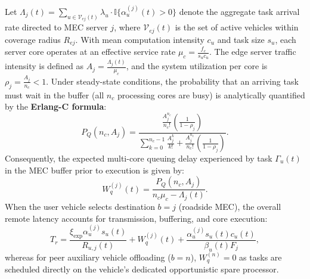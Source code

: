 \documentclass[12pt,a4paper]{article}
\begin{document}
Let $\Lambda_j(t) = \sum_{u \in \mathcal{V}_{ej}(t)} \lambda_u \cdot \mathbb{I}\{\alpha_u^{(j)}(t) > 0\}$ denote the aggregate task arrival rate directed to MEC server $j$, where $\mathcal{V}_{ej}(t)$ is the set of active vehicles within coverage radius $R_{ej}$. With mean computation intensity $c_u$ and task size $s_u$, each server core operates at an effective service rate $\mu_c = \frac{f_c}{s_u c_u}$. The edge server traffic intensity is defined as $A_j = \frac{\Lambda_j(t)}{\mu_c}$, and the system utilization per core is $\rho_j = \frac{A_j}{n_c} < 1$. Under steady-state conditions, the probability that an arriving task must wait in the buffer (all $n_c$ processing cores are busy) is analytically quantified by the \textbf{Erlang-C formula}:
\begin{equation}
P_Q(n_c, A_j) = \frac{\frac{A_j^{n_c}}{n_c!} \left( \frac{1}{1 - \rho_j} \right)}{\sum_{k=0}^{n_c - 1} \frac{A_j^k}{k!} + \frac{A_j^{n_c}}{n_c!} \left( \frac{1}{1 - \rho_j} \right)}.
\label{eq:erlang_c_prob}
\end{equation}
Consequently, the expected multi-core queuing delay experienced by task $\Gamma_u(t)$ in the MEC buffer prior to execution is given by:
\begin{equation}
W_q^{(j)}(t) = \frac{P_Q(n_c, A_j)}{n_c \mu_c - \Lambda_j(t)}.
\label{eq:erlang_c_delay}
\end{equation}
When the user vehicle selects destination $b = j$ (roadside MEC), the overall remote latency accounts for transmission, buffering, and core execution:
\begin{equation}
T_r = \frac{\xi_{\mathrm{exp}} \alpha_u^{(j)} s_u(t)}{R_{u,j}(t)} + W_q^{(j)}(t) + \frac{\alpha_u^{(j)} s_u(t) c_u(t)}{\beta_u(t) F_j},
\label{eq:tr_remote}
\end{equation}
whereas for peer auxiliary vehicle offloading ($b = n$), $W_q^{(n)} = 0$ as tasks are scheduled directly on the vehicle's dedicated opportunistic spare processor.
\end{document}
